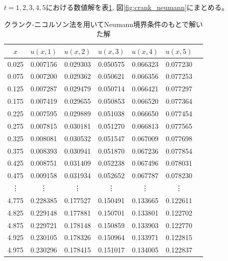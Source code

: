 \documentclass[a4j, titlepage]{jsarticle}
\numberwithin{equation}{section}
\begin{document}
            $t = 1, 2, 3, 4, 5$における数値解を表\ref{tab:crank_neumann}, 図\ref{fig:crank_neumann}にまとめる。
            \begin{table}[h]
                \centering
                \caption{クランク-ニコルソン法を用いてNeumann境界条件のもとで解いた解}
                \label{tab:crank_neumann}
                \begin{tabular}{ccccccc}
                    \hline
                    $x$ & $u(x, 1)$ & $u(x, 2)$ & $u(x, 3)$ & $u(x, 4)$ & $u(x, 5)$
                    \\
                    \hline
                    \hline
                    0.025 & 0.007156 & 0.029303 & 0.050575 & 0.066323 & 0.077230 \\
                    0.075 & 0.007200 & 0.029362 & 0.050621 & 0.066356 & 0.077253 \\
                    0.125 & 0.007287 & 0.029479 & 0.050714 & 0.066421 & 0.077297 \\
                    0.175 & 0.007419 & 0.029655 & 0.050853 & 0.066520 & 0.077364 \\
                    0.225 & 0.007595 & 0.029889 & 0.051038 & 0.066650 & 0.077454 \\
                    0.275 & 0.007815 & 0.030181 & 0.051270 & 0.066813 & 0.077565 \\
                    0.325 & 0.008081 & 0.030532 & 0.051547 & 0.067009 & 0.077698 \\
                    0.375 & 0.008393 & 0.030941 & 0.051870 & 0.067236 & 0.077854 \\
                    0.425 & 0.008751 & 0.031409 & 0.052238 & 0.067496 & 0.078031 \\
                    0.475 & 0.009158 & 0.031934 & 0.052652 & 0.067787 & 0.078230 \\
                    \vdots & \vdots & \vdots & \vdots & \vdots & \vdots \vspace{1mm} \\
                    4.775 & 0.228385 & 0.177527 & 0.150491 & 0.133665 & 0.122611 \\
                    4.825 & 0.229148 & 0.177881 & 0.150701 & 0.133801 & 0.122702 \\
                    4.875 & 0.229721 & 0.178148 & 0.150859 & 0.133903 & 0.122770 \\
                    4.925 & 0.230105 & 0.178326 & 0.150964 & 0.133971 & 0.122815 \\
                    4.975 & 0.230296 & 0.178415 & 0.151017 & 0.134005 & 0.122837 \\

\end{tabular}
\end{table}
\end{document}
